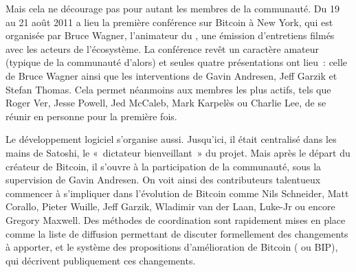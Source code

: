 
Mais cela ne décourage pas pour autant les membres de la communauté. Du 19 au 21 août 2011 a lieu la première conférence sur Bitcoin à New York, qui est organisée par Bruce Wagner, l'animateur du , une émission d'entretiens filmés avec les acteurs de l'écosystème. La conférence revêt un caractère amateur (typique de la communauté d'alors) et seules quatre présentations ont lieu~: celle de Bruce Wagner ainsi que les interventions de Gavin Andresen, Jeff Garzik et Stefan Thomas. Cela permet néanmoins aux membres les plus actifs, tels que Roger Ver, Jesse Powell, Jed McCaleb, Mark Karpelès ou Charlie Lee, de se réunir en personne pour la première fois.

Le développement logiciel s'organise aussi. Jusqu'ici, il était centralisé dans les mains de Satoshi, le «~dictateur bienveillant~» du projet. Mais après le départ du créateur de Bitcoin, il s'ouvre à la participation de la communauté, sous la supervision de Gavin Andresen. On voit ainsi des contributeurs talentueux commencer à s'impliquer dans l'évolution de Bitcoin comme Nils Schneider, Matt Corallo, Pieter Wuille, Jeff Garzik, Wladimir van der Laan, Luke-Jr ou encore Gregory Maxwell. Des méthodes de coordination sont rapidement mises en place comme la liste de diffusion  permettant de discuter formellement des changements à apporter, et le système des propositions d'amélioration de Bitcoin ( ou BIP), qui décrivent publiquement ces changements.

